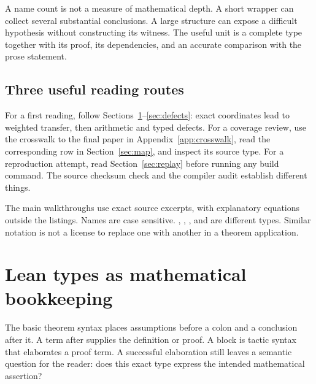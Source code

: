 A name count is not a measure of mathematical depth. A short wrapper can collect several substantial conclusions. A large structure can expose a difficult hypothesis without constructing its witness. The useful unit is a complete type together with its proof, its dependencies, and an accurate comparison with the prose statement.

\subsection{Three useful reading routes}

For a first reading, follow Sections~\ref{sec:types}--\ref{sec:defects}: exact coordinates lead to weighted transfer, then arithmetic and typed defects. For a coverage review, use the crosswalk to the final paper in Appendix~\ref{app:crosswalk}, read the corresponding row in Section~\ref{sec:map}, and inspect its source type. For a reproduction attempt, read Section~\ref{sec:replay} before running any build command. The source checksum check and the compiler audit establish different things.

The main walkthroughs use exact source excerpts, with explanatory equations outside the listings. Names are case sensitive. , , , and  are different types. Similar notation is not a license to replace one with another in a theorem application.

\section{Lean types as mathematical bookkeeping}\label{sec:types}

The basic theorem syntax places assumptions before a colon and a conclusion after it. A term after \code{:=} supplies the definition or proof. A  block is tactic syntax that elaborates a proof term. A successful elaboration still leaves a semantic question for the reader: does this exact type express the intended mathematical assertion?

